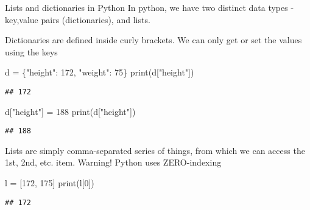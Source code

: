 \documentclass[
  10pt,
  ignorenonframetext,
  aspectratio=169]{beamer}
\newenvironment{Shaded}{\begin{snugshade}}{\end{snugshade}}
\newcommand{\BuiltInTok}[1]{\textcolor[rgb]{0.80,0.80,0.80}{#1}}
\newcommand{\DecValTok}[1]{\textcolor[rgb]{0.86,0.86,0.80}{#1}}
\newcommand{\NormalTok}[1]{\textcolor[rgb]{0.80,0.80,0.80}{#1}}
\newcommand{\OperatorTok}[1]{\textcolor[rgb]{0.94,0.94,0.82}{#1}}
\newcommand{\StringTok}[1]{\textcolor[rgb]{0.80,0.58,0.58}{#1}}
\begin{document}
\begin{frame}[fragile]{Lists and dictionaries in Python}
\protect\hypertarget{lists-and-dictionaries-in-python}{}
In python, we have two distinct data types - key,value pairs
(dictionaries), and lists.

Dictionaries are defined inside curly brackets. We can only get or set
the values using the keys

\scriptsize

\begin{Shaded}
\begin{Highlighting}[]
\NormalTok{d }\OperatorTok{=}\NormalTok{ \{}\StringTok{"height"}\NormalTok{: }\DecValTok{172}\NormalTok{, }\StringTok{"weight"}\NormalTok{: }\DecValTok{75}\NormalTok{\}}
\BuiltInTok{print}\NormalTok{(d[}\StringTok{"height"}\NormalTok{])}
\end{Highlighting}
\end{Shaded}

\begin{verbatim}
## 172
\end{verbatim}

\begin{Shaded}
\begin{Highlighting}[]
\NormalTok{d[}\StringTok{"height"}\NormalTok{] }\OperatorTok{=} \DecValTok{188}
\BuiltInTok{print}\NormalTok{(d[}\StringTok{"height"}\NormalTok{])}
\end{Highlighting}
\end{Shaded}

\begin{verbatim}
## 188
\end{verbatim}

\normalsize

Lists are simply comma-separated series of things, from which we can
access the 1st, 2nd, etc. item. Warning! Python uses ZERO-indexing

\scriptsize

\begin{Shaded}
\begin{Highlighting}[]
\NormalTok{l }\OperatorTok{=}\NormalTok{ [}\DecValTok{172}\NormalTok{, }\DecValTok{175}\NormalTok{]}
\BuiltInTok{print}\NormalTok{(l[}\DecValTok{0}\NormalTok{])}
\end{Highlighting}
\end{Shaded}

\begin{verbatim}
## 172
\end{verbatim}
\end{frame}
\end{document}
